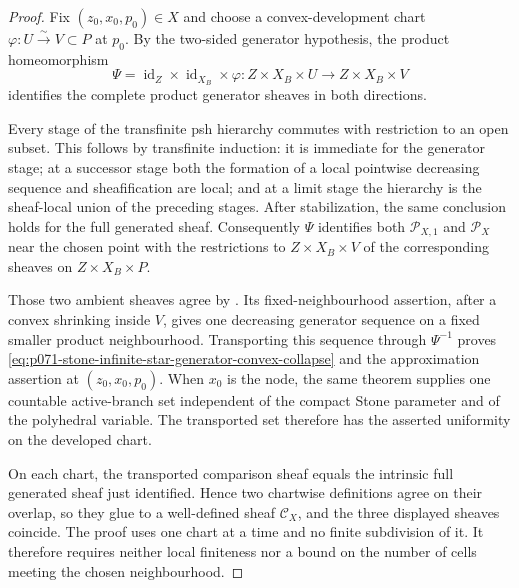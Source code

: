 \begin{proof}
Fix $(z_0,x_0,p_0)\in X$ and choose a convex-development chart
$\varphi:U\xrightarrow{\sim}V\subset P$ at $p_0$.  By the two-sided
generator hypothesis, the product homeomorphism
\[
 \Psi=\operatorname{id}_Z\times\operatorname{id}_{X_B}\times\varphi:
 Z\times X_B\times U\longrightarrow Z\times X_B\times V
\]
identifies the complete product generator sheaves in both directions.

Every stage of the transfinite psh hierarchy commutes with restriction to
an open subset.  This follows by transfinite induction: it is immediate for
the generator stage; at a successor stage both the formation of a local
pointwise decreasing sequence and sheafification are local; and at a limit
stage the hierarchy is the sheaf-local union of the preceding stages.
After stabilization, the same conclusion holds for the full generated
sheaf.  Consequently $\Psi$ identifies both $\mathcal P_{X,1}$ and
$\mathcal P_X$ near the chosen point with the restrictions to
$Z\times X_B\times V$ of the corresponding sheaves on
$Z\times X_B\times P$.

Those two ambient sheaves agree by
.  Its
fixed-neighbourhood assertion, after a convex shrinking inside $V$, gives
one decreasing generator sequence on a fixed smaller product
neighbourhood.  Transporting this sequence through $\Psi^{-1}$ proves
\eqref{eq:p071-stone-infinite-star-generator-convex-collapse} and the
approximation assertion at $(z_0,x_0,p_0)$.  When $x_0$ is the node, the
same theorem supplies one countable active-branch set independent of the
compact Stone parameter and of the polyhedral variable.  The transported
set therefore has the asserted uniformity on the developed chart.

On each chart, the transported comparison sheaf equals the intrinsic full
generated sheaf just identified.  Hence two chartwise definitions agree on
their overlap, so they glue to a well-defined sheaf $\mathcal C_X$, and the
three displayed sheaves coincide.  The proof uses one chart at a time and
no finite subdivision of it.  It therefore requires neither local
finiteness nor a bound on the number of cells meeting the chosen
neighbourhood.
\end{proof}
